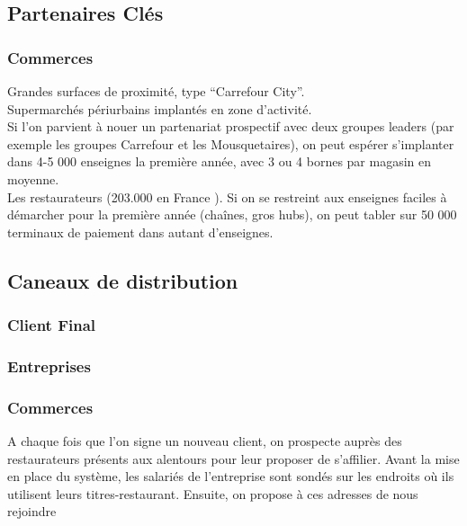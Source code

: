 \subsection{Partenaires Clés}

\subsubsection{Commerces}

Grandes surfaces de proximité, type “Carrefour City”. \\
Supermarchés périurbains implantés en zone d’activité. \\

Si l’on parvient à nouer un partenariat prospectif avec deux groupes leaders
(par exemple les groupes Carrefour et les Mousquetaires), on peut espérer
s’implanter dans 4-5 000 enseignes la première année, avec 3 ou 4 bornes par
magasin en moyenne. \\

Les restaurateurs (203.000 en France ). Si on se restreint aux enseignes
faciles à démarcher pour la première année (chaînes, gros hubs), on peut tabler
sur 50 000 terminaux de paiement dans autant d’enseignes. \\

\subsection{Caneaux de distribution}

\subsubsection{Client Final}

\subsubsection{Entreprises}

\subsubsection{Commerces}
A chaque fois que l’on signe un nouveau client, on prospecte auprès des
restaurateurs présents aux alentours pour leur proposer de s’affilier. Avant la
mise en place du système, les salariés de l’entreprise sont sondés sur les
endroits où ils utilisent leurs titres-restaurant. Ensuite, on propose à ces
adresses de nous rejoindre \\

